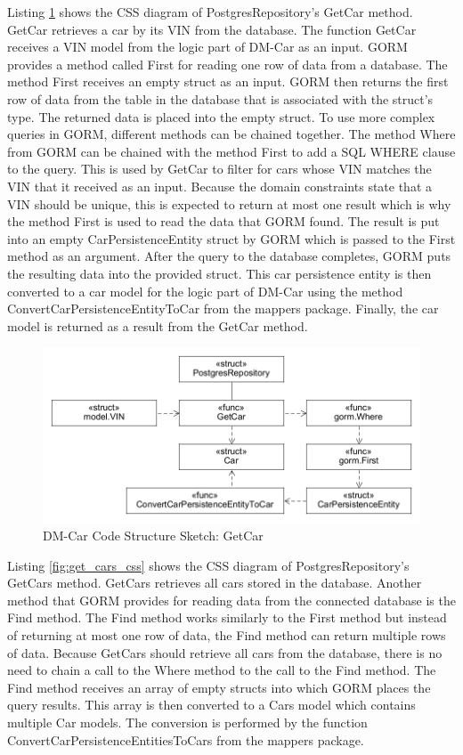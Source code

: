 Listing \ref{fig:get_car_css} shows the CSS diagram of PostgresRepository's GetCar method.
GetCar retrieves a car by its VIN from the database.
The function GetCar receives a VIN model from the logic part of DM-Car as an input.
GORM provides a method called First for reading one row of data from a database.
The method First receives an empty struct as an input. GORM then returns the first row
of data from the table in the database that is associated with the struct's type.
The returned data is placed into the empty struct. To use more complex queries in GORM,
different methods can be chained together. The method Where from GORM can be chained
with the method First to add a SQL WHERE clause to the query.
This is used by GetCar to filter for cars whose VIN matches the VIN that it received as an input.
Because the domain constraints state that a VIN should be unique, this is expected to return at most
one result which is why the method First is used to read the data that GORM found.
The result is put into an empty CarPersistenceEntity struct by GORM which is passed to the First method as an argument.
After the query to the database completes, GORM puts the resulting data into the provided struct.
This car persistence entity is then converted to a car model for the logic part of DM-Car
using the method ConvertCarPersistenceEntityToCar from the mappers package.
Finally, the car model is returned as a result from the GetCar method.

\begin{figure}[tb]
	\centering
	\includegraphics[width=\textwidth]{figures/GetCarCSS.png}
	\caption{DM-Car Code Structure Sketch: GetCar}
	\label{fig:get_car_css}
\end{figure}

Listing \ref{fig:get_cars_css} shows the CSS diagram of PostgresRepository's GetCars method.
GetCars retrieves all cars stored in the database.
Another method that GORM provides for reading data from the connected database is the Find method.
The Find method works similarly to the First method but instead of returning at most one row of data,
the Find method can return multiple rows of data. Because GetCars should retrieve all cars
from the database, there is no need to chain a call to the Where method to the call to the Find method.
The Find method receives an array of empty structs into which GORM places the query results.
This array is then converted to a Cars model which contains multiple Car models.
The conversion is performed by the function ConvertCarPersistenceEntitiesToCars from the mappers package.

